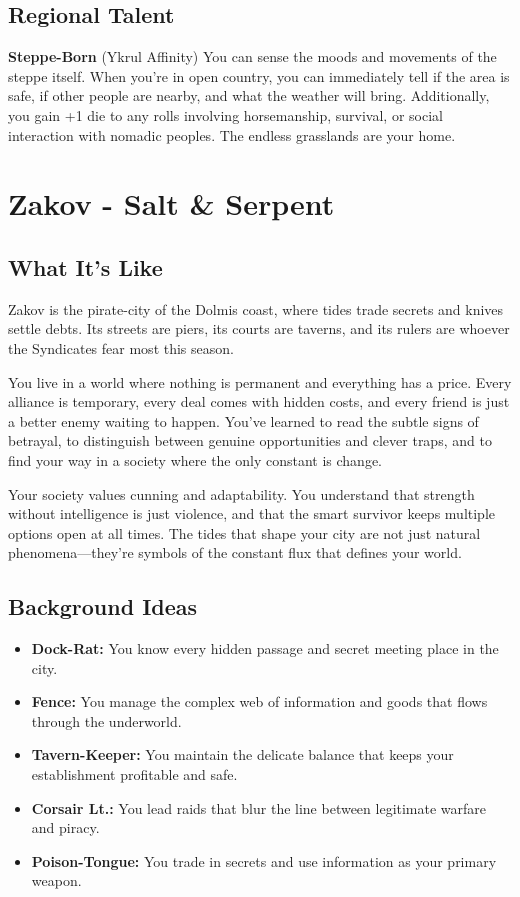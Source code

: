 \documentclass[11pt]{article}
\newcommand{\region}[1]{\section*{#1}}
\newcommand{\subregion}[1]{\subsection*{#1}}
\begin{document}
\begin{multicols}{2}
\subregion{Regional Talent}

\textbf{Steppe-Born} (Ykrul Affinity)
You can sense the moods and movements of the steppe itself. When you're in open country, you can immediately tell if the area is safe, if other people are nearby, and what the weather will bring. Additionally, you gain +1 die to any rolls involving horsemanship, survival, or social interaction with nomadic peoples. The endless grasslands are your home.

\end{multicols}

\region{Zakov - Salt \& Serpent}

\begin{multicols}{2}
\subregion{What It's Like}

Zakov is the pirate-city of the Dolmis coast, where tides trade secrets and knives settle debts. Its streets are piers, its courts are taverns, and its rulers are whoever the Syndicates fear most this season.

You live in a world where nothing is permanent and everything has a price. Every alliance is temporary, every deal comes with hidden costs, and every friend is just a better enemy waiting to happen. You've learned to read the subtle signs of betrayal, to distinguish between genuine opportunities and clever traps, and to find your way in a society where the only constant is change.

Your society values cunning and adaptability. You understand that strength without intelligence is just violence, and that the smart survivor keeps multiple options open at all times. The tides that shape your city are not just natural phenomena—they're symbols of the constant flux that defines your world.

\columnbreak

\subregion{Background Ideas}

\begin{itemize}[leftmargin=*]
    \item \textbf{Dock-Rat:} You know every hidden passage and secret meeting place in the city.
    \item \textbf{Fence:} You manage the complex web of information and goods that flows through the underworld.
    \item \textbf{Tavern-Keeper:} You maintain the delicate balance that keeps your establishment profitable and safe.
    \item \textbf{Corsair Lt.:} You lead raids that blur the line between legitimate warfare and piracy.
    \item \textbf{Poison-Tongue:} You trade in secrets and use information as your primary weapon.
\end{itemize}


\end{multicols}
\end{document}
